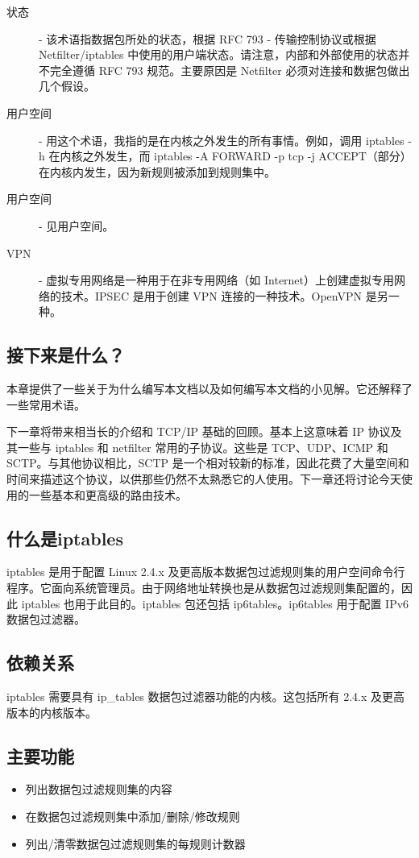 \documentclass[12pt,UTF8]{ctexbook}
\begin{document}
\begin{description}
  \item[状态] - 该术语指数据包所处的状态，根据 RFC 793 - 传输控制协议或根据 Netfilter/iptables 中使用的用户端状态。请注意，内部和外部使用的状态并不完全遵循 RFC 793 规范。主要原因是 Netfilter 必须对连接和数据包做出几个假设。
  
  \item[用户空间] - 用这个术语，我指的是在内核之外发生的所有事情。例如，调用 iptables -h 在内核之外发生，而 iptables -A FORWARD -p tcp -j ACCEPT（部分）在内核内发生，因为新规则被添加到规则集中。
  
  \item[用户空间] - 见用户空间。
  
  \item[VPN] - 虚拟专用网络是一种用于在非专用网络（如 Internet）上创建虚拟专用网络的技术。IPSEC 是用于创建 VPN 连接的一种技术。OpenVPN 是另一种。
\end{description}

\subsection{接下来是什么？}
本章提供了一些关于为什么编写本文档以及如何编写本文档的小见解。它还解释了一些常用术语。

下一章将带来相当长的介绍和 TCP/IP 基础的回顾。基本上这意味着 IP 协议及其一些与 iptables 和 netfilter 常用的子协议。这些是 TCP、UDP、ICMP 和 SCTP。与其他协议相比，SCTP 是一个相对较新的标准，因此花费了大量空间和时间来描述这个协议，以供那些仍然不太熟悉它的人使用。下一章还将讨论今天使用的一些基本和更高级的路由技术。

\subsection{什么是iptables}
iptables 是用于配置 Linux 2.4.x 及更高版本数据包过滤规则集的用户空间命令行程序。它面向系统管理员。由于网络地址转换也是从数据包过滤规则集配置的，因此 iptables 也用于此目的。iptables 包还包括 ip6tables。ip6tables 用于配置 IPv6 数据包过滤器。

\subsection{依赖关系}
iptables 需要具有 ip\_tables 数据包过滤器功能的内核。这包括所有 2.4.x 及更高版本的内核版本。

\subsection{主要功能}
\begin{itemize}
  \item 列出数据包过滤规则集的内容
  \item 在数据包过滤规则集中添加/删除/修改规则
  \item 列出/清零数据包过滤规则集的每规则计数器
\end{itemize}
\end{document}
